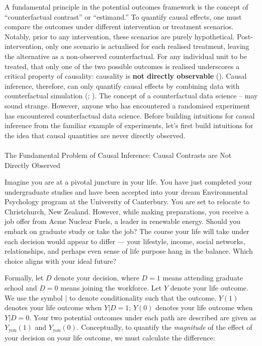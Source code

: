 \documentclass[
  singlecolumn]{article}
\makeatletter
\let\oldparagraph\paragraph
\renewcommand{\paragraph}{
    \@ifstar
      \xxxParagraphStar
      \xxxParagraphNoStar
  }
\newcommand{\xxxParagraphStar}[1]{\oldparagraph*{#1}\mbox{}}
\newcommand{\xxxParagraphNoStar}[1]{\oldparagraph{#1}\mbox{}}
\makeatother
\begin{document}
A fundamental principle in the potential outcomes framework is the
concept of ``counterfactual contrast'' or ``estimand.'' To quantify
causal effects, one must compare the outcomes under different
intervention or treatment scenarios. Notably, prior to any intervention,
these scenarios are purely hypothetical. Post-intervention, only one
scenario is actualised for each realised treatment, leaving the
alternative as a non-observed counterfactual. For any individual unit to
be treated, that only one of the two possible outcomes is realised
underscores a critical property of causality: causality is \textbf{not
directly observable} (). Causal
inference, therefore, can only quantify causal effects by combining data
with counterfactual simulation (; ). The concept of a counterfactual data science -- may sound
strange. However, anyone who has encountered a randomised experiment has
encountered counterfactual data science. Before building intuitions for
causal inference from the familiar example of experiments, let's first
build intuitions for the idea that causal quantities are never directly
observed.

\paragraph{The Fundamental Problem of Causal Inference: Causal Contrasts
are Not Directly
Observed}\label{the-fundamental-problem-of-causal-inference-causal-contrasts-are-not-directly-observed}

Imagine you are at a pivotal juncture in your life. You have just
completed your undergraduate studies and have been accepted into your
dream Environmental Psychology program at the University of Canterbury.
You are set to relocate to Christchurch, New Zealand. However, while
making preparations, you receive a job offer from Acme Nuclear Fuels, a
leader in renewable energy. Should you embark on graduate study or take
the job? The course your life will take under each decision would appear
to differ --- your lifestyle, income, social networks, relationships,
and perhaps even sense of life purpose hang in the balance. Which choice
aligns with your ideal future?

Formally, let \(D\) denote your decision, where \(D = 1\) means
attending graduate school and \(D = 0\) means joining the workforce. Let
\(Y\) denote your life outcome. We use the symbol \(|\) to denote
conditionality such that the outcome. \(Y(1)\) denotes your life outcome
when \(Y|D=1\); \(Y(0)\) denotes your life outcome when \(Y|D=0\). Your
two potential outcomes under each path are described are given as
\(Y_{\text{you}}(1)\) and \(Y_{\text{you}}(0)\). Conceptually, to
quantify the \emph{magnitude} of the effect of your decision on your
life outcome, we must calculate the difference:
\end{document}
